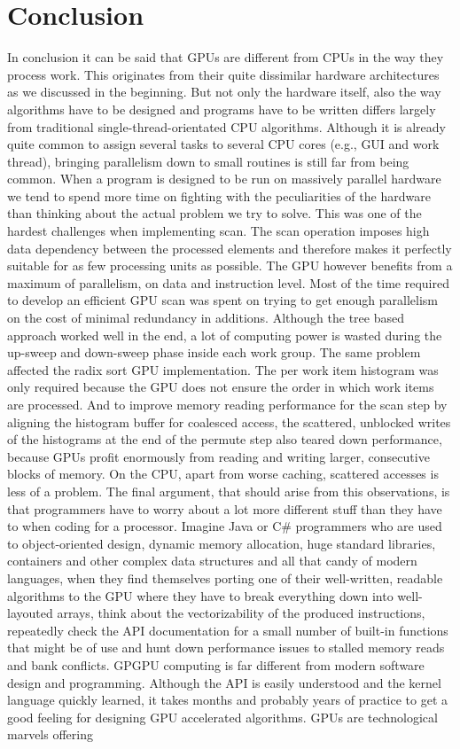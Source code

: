 \section{Conclusion}

In conclusion it can be said that GPUs are different from CPUs in the way they process work. This originates from their quite dissimilar hardware architectures as we discussed in the beginning. But not only the hardware itself, also the way algorithms have to be designed and programs have to be written differs largely from traditional single-thread-orientated CPU algorithms. Although it is already quite common to assign several tasks to several CPU cores (e.g., GUI and work thread), bringing parallelism down to small routines is still far from being common. When a program is designed to be run on massively parallel hardware we tend to spend more time on fighting with the peculiarities of the hardware than thinking about the actual problem we try to solve. This was one of the hardest challenges when implementing scan. The scan operation imposes high data dependency between the processed elements and therefore makes it perfectly suitable for as few processing units as possible. The GPU however benefits from a maximum of parallelism, on data and instruction level. Most of the time required to develop an efficient GPU scan was spent on trying to get enough parallelism on the cost of minimal redundancy in additions. Although the tree based approach worked well in the end, a lot of computing power is wasted during the up-sweep and down-sweep phase inside each work group. The same problem affected the radix sort GPU implementation. The per work item histogram was only required because the GPU does not ensure the order in which work items are processed. And to improve memory reading performance for the scan step by aligning the histogram buffer for coalesced access, the scattered, unblocked writes of the histograms at the end of the permute step also teared down performance, because GPUs profit enormously from reading and writing larger, consecutive blocks of memory. On the CPU, apart from worse caching, scattered accesses is less of a problem. The final argument, that should arise from this observations, is that programmers have to worry about a lot more different stuff than they have to when coding for a processor. Imagine Java or C\# programmers who are used to object-oriented design, dynamic memory allocation, huge standard libraries, containers and other complex data structures and all that candy of modern languages, when they find themselves porting one of their well-written, readable algorithms to the GPU where they have to break everything down into well-layouted arrays, think about the vectorizability of the produced instructions, repeatedly check the API documentation for a small number of built-in functions that might be of use and hunt down performance issues to stalled memory reads and bank conflicts. GPGPU computing is far different from modern software design and programming. Although the API is easily understood and the kernel language quickly learned, it takes months and probably years of practice to get a good feeling for designing GPU accelerated algorithms. GPUs are technological marvels offering 